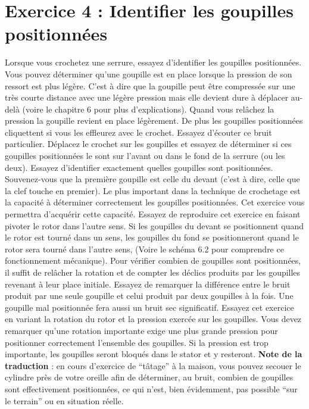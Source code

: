 \documentclass[a4paper,french,11pt,twoside]{report}
\begin{document}
\section{Exercice 4 : Identifier les goupilles positionnées}
Lorsque vous crochetez une serrure, essayez d'identifier les goupilles positionnées. Vous pouvez déterminer qu'une goupille est en place lorsque la pression de son ressort est plus légère. C'est à dire que la goupille peut être compressée sur une très courte distance avec une légère pression mais elle devient dure à déplacer au-delà (voire le chapitre 6 pour plus d'explications). Quand vous relâchez la pression la goupille revient en place légèrement. De plus les goupilles positionnées cliquettent si vous les effleurez avec le crochet. Essayez d'écouter ce bruit particulier.
Déplacez le crochet sur les goupilles et essayez de déterminer si ces goupilles positionnées le sont sur l'avant ou dans le fond de la serrure (ou les deux). Essayez d'identifier exactement quelles goupilles sont positionnées. Souvenez-vous que la première goupille est celle du devant (c'est à dire, celle que la clef touche en premier). Le plus important dans la technique de crochetage est la capacité à déterminer correctement les goupilles positionnées. Cet exercice vous permettra d'acquérir cette capacité.
Essayez de reproduire cet exercice en faisant pivoter le rotor dans l'autre sens. Si les goupilles du devant se positionnent quand le rotor est tourné dans un sens, les goupilles du fond se positionneront quand le rotor sera tourné dans l'autre sens, (Voire le schéma 6.2 pour comprendre ce fonctionnement mécanique).
Pour vérifier combien de goupilles sont positionnées, il suffit de relâcher la rotation et de compter les déclics produits par les goupilles revenant à leur place initiale. Essayez de remarquer la différence entre le bruit produit par une seule goupille et celui produit par deux goupilles à la fois. Une goupille mal positionnée fera aussi un bruit sec significatif.
Essayez cet exercice en variant la rotation du rotor et la pression exercée sur les goupilles. Vous devez remarquer qu'une rotation importante exige une plus grande pression pour positionner correctement l'ensemble des goupilles. Si la pression est trop importante, les goupilles seront bloqués dans le stator et y resteront.
\noindent \textbf{Note de la traduction} : en cours d'exercice de \enquote{tâtage} à la maison, vous pouvez secouer le cylindre près de votre oreille afin de déterminer, au bruit, combien de goupilles sont effectivement positionnées, ce qui n'est, bien évidemment, pas possible \enquote{sur le terrain} ou en situation réelle.
\end{document}
